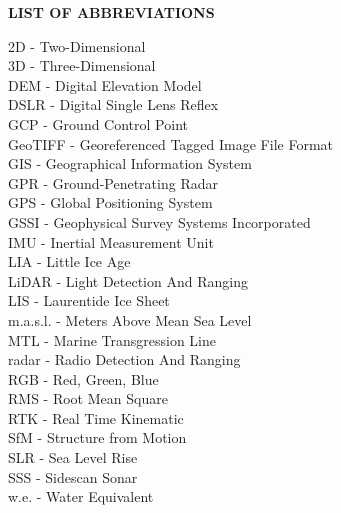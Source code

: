\begin{center}
\textbf{LIST OF ABBREVIATIONS}
\end{center}
\begin{multicols}{2}
\noindent 2D - Two-Dimensional\\
\noindent 3D - Three-Dimensional\\
\noindent DEM - Digital Elevation Model\\
\noindent DSLR - Digital Single Lens Reflex\\
\noindent GCP - Ground Control Point\\
\noindent GeoTIFF - Georeferenced Tagged Image File Format\\
\noindent GIS - Geographical Information System\\
\noindent GPR - Ground-Penetrating Radar\\
\noindent GPS - Global Positioning System\\
\noindent GSSI - Geophysical Survey Systems Incorporated\\
\noindent IMU - Inertial Measurement Unit\\
\noindent LIA - Little Ice Age\\
\noindent LiDAR - Light Detection And Ranging\\
\noindent LIS - Laurentide Ice Sheet\\
\noindent m.a.s.l. - Meters Above Mean Sea Level\\
\noindent MTL - Marine Transgression Line\\
\noindent radar - Radio Detection And Ranging\\
\noindent RGB - Red, Green, Blue\\
\noindent RMS - Root Mean Square\\
\noindent RTK - Real Time Kinematic\\
\noindent SfM - Structure from Motion\\
\noindent SLR - Sea Level Rise\\
\noindent SSS - Sidescan Sonar\\
\noindent w.e. - Water Equivalent\\
\end{multicols}
\endinput